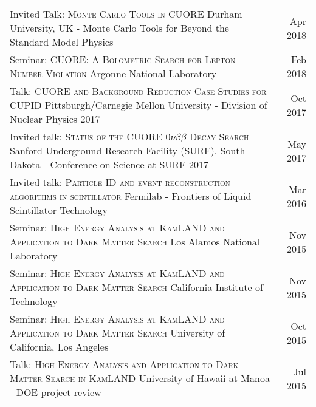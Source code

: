\documentclass[10pt]{article} %
\begin{document}
\noindent\begin{tabularx}{\linewidth}{@{{}\textbullet\enskip}X@{\quad}r@{}}
\addlinespace[5pt]
Invited Talk: \textsc{Monte Carlo Tools in CUORE} \newline Durham University, UK - Monte Carlo Tools for Beyond the Standard Model Physics & Apr 2018 \\

\addlinespace[5pt]
Seminar: \textsc{CUORE: A Bolometric Search for Lepton Number Violation} \newline Argonne National Laboratory & Feb 2018 \\

\addlinespace[5pt]
Talk: \textsc{CUORE and Background Reduction Case Studies for CUPID} \newline Pittsburgh/Carnegie Mellon University - Division of Nuclear Physics 2017 & Oct 2017 \\

\addlinespace[5pt]
Invited talk: \textsc{Status of the CUORE $0\nu\beta\beta$ Decay Search} \newline Sanford Underground Research Facility (SURF), South Dakota - Conference on Science at SURF 2017 & May 2017 \\

\addlinespace[5pt]
Invited talk: \textsc{Particle ID and event reconstruction algorithms in scintillator} \newline Fermilab - Frontiers of Liquid Scintillator Technology & Mar 2016 \\

\addlinespace[5pt]
Seminar: \textsc{High Energy Analysis at KamLAND and Application to Dark Matter Search} \newline Los Alamos National Laboratory & Nov 2015 \\

\addlinespace[5pt]
Seminar: \textsc{High Energy Analysis at KamLAND and Application to Dark Matter Search} \newline California Institute of Technology & Nov 2015 \\

\addlinespace[5pt]
Seminar: \textsc{High Energy Analysis at KamLAND and Application to Dark Matter Search} \newline University of California, Los Angeles & Oct 2015 \\

\addlinespace[5pt]
Talk: \textsc{High Energy Analysis and Application to Dark Matter Search in KamLAND} \newline University of Hawaii at Manoa - DOE project review & Jul 2015 \\


\end{tabularx}
\end{document}

